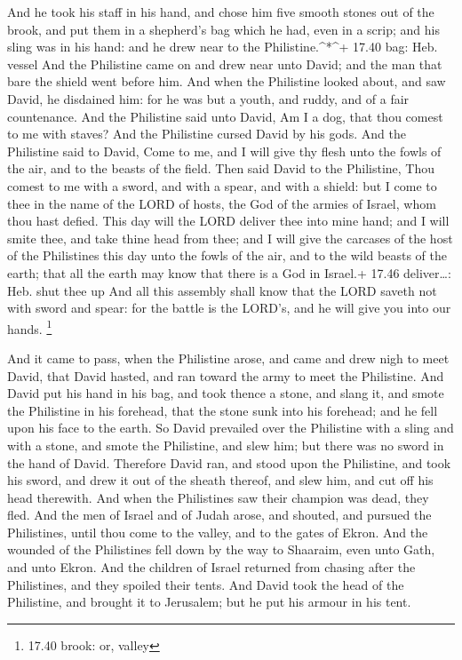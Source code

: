  And he took his staff in his hand, and chose him five
smooth stones out of the brook, and put them in a shepherd's bag which
he had, even in a scrip; and his sling was in his hand: and he drew near
to the Philistine.\^{}*\^{}+ 17.40 bag: Heb. vessel  And
the Philistine came on and drew near unto David; and the man that bare
the shield went before him.  And when the Philistine looked
about, and saw David, he disdained him: for he was but a youth, and
ruddy, and of a fair countenance.  And the Philistine said
unto David, Am I a dog, that thou comest to me with staves? And the
Philistine cursed David by his gods.  And the Philistine
said to David, Come to me, and I will give thy flesh unto the fowls of
the air, and to the beasts of the field.  Then said David
to the Philistine, Thou comest to me with a sword, and with a spear, and
with a shield: but I come to thee in the name of the LORD of hosts, the
God of the armies of Israel, whom thou hast defied.  This
day will the LORD deliver thee into mine hand; and I will smite thee,
and take thine head from thee; and I will give the carcases of the host
of the Philistines this day unto the fowls of the air, and to the wild
beasts of the earth; that all the earth may know that there is a God in
Israel.+ 17.46 deliver\ldots: Heb. shut thee up  And all
this assembly shall know that the LORD saveth not with sword and spear:
for the battle is the LORD's, and he will give you into our hands.
\footnote{17.40 brook: or, valley}

 And it came to pass, when the Philistine arose, and came
and drew nigh to meet David, that David hasted, and ran toward the army
to meet the Philistine.  And David put his hand in his bag,
and took thence a stone, and slang it, and smote the Philistine in his
forehead, that the stone sunk into his forehead; and he fell upon his
face to the earth.  So David prevailed over the Philistine
with a sling and with a stone, and smote the Philistine, and slew him;
but there was no sword in the hand of David.  Therefore
David ran, and stood upon the Philistine, and took his sword, and drew
it out of the sheath thereof, and slew him, and cut off his head
therewith. And when the Philistines saw their champion was dead, they
fled.  And the men of Israel and of Judah arose, and
shouted, and pursued the Philistines, until thou come to the valley, and
to the gates of Ekron. And the wounded of the Philistines fell down by
the way to Shaaraim, even unto Gath, and unto Ekron.  And
the children of Israel returned from chasing after the Philistines, and
they spoiled their tents.  And David took the head of the
Philistine, and brought it to Jerusalem; but he put his armour in his
tent.

